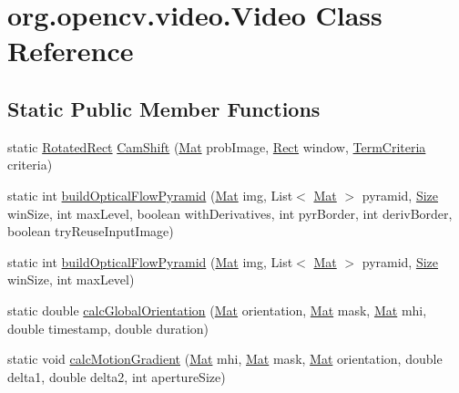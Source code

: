 \hypertarget{classorg_1_1opencv_1_1video_1_1_video}{}\section{org.\+opencv.\+video.\+Video Class Reference}
\label{classorg_1_1opencv_1_1video_1_1_video}
\subsection*{Static Public Member Functions}
\begin{DoxyCompactItemize}
\item 
static \mbox{\hyperlink{classorg_1_1opencv_1_1core_1_1_rotated_rect}{Rotated\+Rect}} \mbox{\hyperlink{classorg_1_1opencv_1_1video_1_1_video_a7fea50982bba688250537e83cd11fabd}{Cam\+Shift}} (\mbox{\hyperlink{classorg_1_1opencv_1_1core_1_1_mat}{Mat}} prob\+Image, \mbox{\hyperlink{classorg_1_1opencv_1_1core_1_1_rect}{Rect}} window, \mbox{\hyperlink{classorg_1_1opencv_1_1core_1_1_term_criteria}{Term\+Criteria}} criteria)
\item 
static int \mbox{\hyperlink{classorg_1_1opencv_1_1video_1_1_video_a84281eba959eb6d424d94aca84ae738f}{build\+Optical\+Flow\+Pyramid}} (\mbox{\hyperlink{classorg_1_1opencv_1_1core_1_1_mat}{Mat}} img, List$<$ \mbox{\hyperlink{classorg_1_1opencv_1_1core_1_1_mat}{Mat}} $>$ pyramid, \mbox{\hyperlink{classorg_1_1opencv_1_1core_1_1_size}{Size}} win\+Size, int max\+Level, boolean with\+Derivatives, int pyr\+Border, int deriv\+Border, boolean try\+Reuse\+Input\+Image)
\item 
static int \mbox{\hyperlink{classorg_1_1opencv_1_1video_1_1_video_ac702001e72ad8f8b5b8ae410e50da9f8}{build\+Optical\+Flow\+Pyramid}} (\mbox{\hyperlink{classorg_1_1opencv_1_1core_1_1_mat}{Mat}} img, List$<$ \mbox{\hyperlink{classorg_1_1opencv_1_1core_1_1_mat}{Mat}} $>$ pyramid, \mbox{\hyperlink{classorg_1_1opencv_1_1core_1_1_size}{Size}} win\+Size, int max\+Level)
\item 
static double \mbox{\hyperlink{classorg_1_1opencv_1_1video_1_1_video_af1c43b47c6d850912e164484269ee8d1}{calc\+Global\+Orientation}} (\mbox{\hyperlink{classorg_1_1opencv_1_1core_1_1_mat}{Mat}} orientation, \mbox{\hyperlink{classorg_1_1opencv_1_1core_1_1_mat}{Mat}} mask, \mbox{\hyperlink{classorg_1_1opencv_1_1core_1_1_mat}{Mat}} mhi, double timestamp, double duration)
\item 
static void \mbox{\hyperlink{classorg_1_1opencv_1_1video_1_1_video_a9e39d32cda591f5413791f116cfc1a8b}{calc\+Motion\+Gradient}} (\mbox{\hyperlink{classorg_1_1opencv_1_1core_1_1_mat}{Mat}} mhi, \mbox{\hyperlink{classorg_1_1opencv_1_1core_1_1_mat}{Mat}} mask, \mbox{\hyperlink{classorg_1_1opencv_1_1core_1_1_mat}{Mat}} orientation, double delta1, double delta2, int aperture\+Size)

\end{DoxyCompactItemize}
